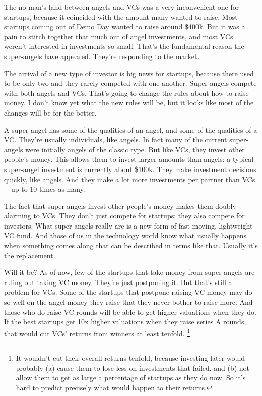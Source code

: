 The no man's land between angels and VCs was a very inconvenient one for
startups, because it coincided with the amount many wanted to raise.
Most startups coming out of Demo Day wanted to raise around \$400k. But
it was a pain to stitch together that much out of angel investments, and
most VCs weren't interested in investments so small. That's the
fundamental reason the super-angels have appeared. They're responding to
the market.

The arrival of a new type of investor is big news for startups, because
there used to be only two and they rarely competed with one another.
Super-angels compete with both angels and VCs. That's going to change
the rules about how to raise money. I don't know yet what the new rules
will be, but it looks like most of the changes will be for the better.

A super-angel has some of the qualities of an angel, and some of the
qualities of a VC. They're usually individuals, like angels. In fact
many of the current super-angels were initially angels of the classic
type. But like VCs, they invest other people's money. This allows them
to invest larger amounts than angels: a typical super-angel investment
is currently about \$100k. They make investment decisions quickly, like
angels. And they make a lot more investments per partner than VCs---up
to 10 times as many.

The fact that super-angels invest other people's money makes them doubly
alarming to VCs. They don't just compete for startups; they also compete
for investors. What super-angels really are is a new form of
fast-moving, lightweight VC fund. And those of us in the technology
world know what usually happens when something comes along that can be
described in terms like that. Usually it's the replacement.

Will it be? As of now, few of the startups that take money from
super-angels are ruling out taking VC money. They're just postponing it.
But that's still a problem for VCs. Some of the startups that postpone
raising VC money may do so well on the angel money they raise that they
never bother to raise more. And those who do raise VC rounds will be
able to get higher valuations when they do. If the best startups get 10x
higher valuations when they raise series A rounds, that would cut VCs'
returns from winners at least tenfold. \footnote{It wouldn't cut their overall returns tenfold, because investing
later would probably (a) cause them to lose less on investments that
failed, and (b) not allow them to get as large a percentage of startups
as they do now. So it's hard to predict precisely what would happen to
their returns.}

